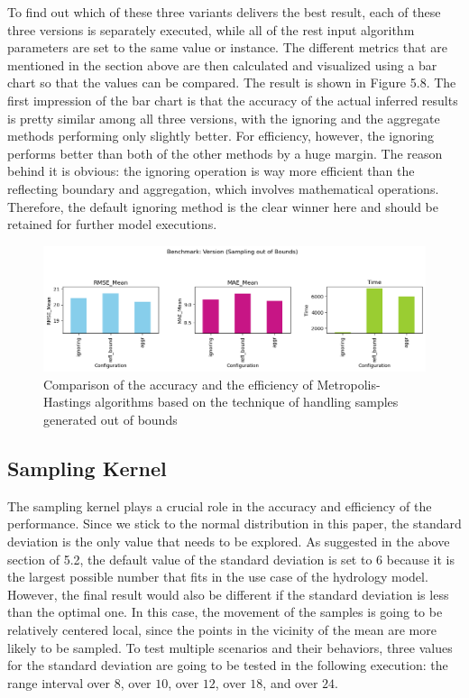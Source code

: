 To find out which of these three variants delivers the best result, each of these three versions is separately executed, while all of the rest input algorithm parameters are set to the same value or instance. The different metrics that are mentioned in the section above are then calculated and visualized using a bar chart so that the values can be compared. The result is shown in Figure 5.8. The first impression of the bar chart is that the accuracy of the actual inferred results is pretty similar among all three versions, with the ignoring and the aggregate methods performing only slightly better. For efficiency, however, the ignoring performs better than both of the other methods by a huge margin. The reason behind it is obvious: the ignoring operation is way more efficient than the reflecting boundary and aggregation, which involves mathematical operations. Therefore, the default ignoring method is the clear winner here and should be retained for further model executions.


\begin{figure}[H]
    \centering
    \includegraphics[width=1\textwidth]{figures/basic_mh/benchmark/sampling_otb.png}
    \captionsetup{width=.8\textwidth}
    \caption{Comparison of the accuracy and the efficiency of Metropolis-Hastings algorithms based on the technique of handling samples generated out of bounds}
    \label{fig:enter-label}
\end{figure}



\subsection{Sampling Kernel}
The sampling kernel plays a crucial role in the accuracy and efficiency of the performance. Since we stick to the normal distribution in this paper, the standard deviation is the only value that needs to be explored. As suggested in the above section of 5.2, the default value of the standard deviation is set to $6$ because it is the largest possible number that fits in the use case of the hydrology model. However, the final result would also be different if the standard deviation is less than the optimal one. In this case, the movement of the samples is going to be relatively centered local, since the points in the vicinity of the mean are more likely to be sampled. To test multiple scenarios and their behaviors, three values for the standard deviation are going to be tested in the following execution: the range interval over $8$, over $10$, over $12$, over $18$, and over $24$.

